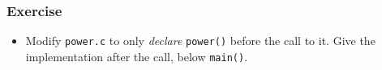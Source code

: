 \begin{frame}
  \frametitle{Exercise}

  \begin{itemize}
  \item Modify \texttt{power.c} to only \textit{declare}
    \texttt{power()} before the call to it. Give the implementation
    after the call, below \texttt{main()}.
  \end{itemize}
  
\end{frame}
